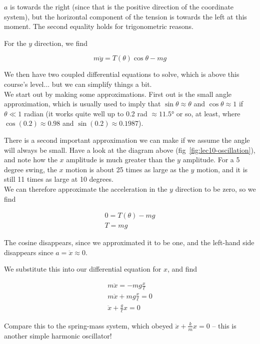 $a$ is towards the right (since that is the positive direction of the coordinate system), but the horizontal component of the tension is towards the left at this moment. The second equality holds for trigonometric reasons.

For the $y$ direction, we find

\begin{equation}
m \ddot{y} = T(\theta) \cos \theta - m g
\end{equation}

We then have two coupled differential equations to solve, which is above this course's level... but we can simplify things a bit.\\
We start out by making some approximations. First out is the small angle approximation, which is usually used to imply that $\sin \theta \approx \theta$ and $\cos \theta \approx 1$ if $\theta \ll 1$ radian (it works quite well up to 0.2 rad $\approx \ang{11.5}$ or so, at least, where $\cos(0.2) \approx 0.98$ and $\sin(0.2) \approx 0.1987$).

There is a second important approximation we can make if we assume the angle will always be small. Have a look at the diagram above (fig~\ref{fig:lec10-oscillation}), and note how the $x$ amplitude is much greater than the $y$ amplitude. For a 5 degree swing, the $x$ motion is about 25 times as large as the $y$ motion, and it is still 11 times as large at 10 degrees.\\
We can therefore approximate the acceleration in the $y$ direction to be zero, so we find

\begin{align}
0 = T(\theta) - m g\\
T = m g
\end{align}

The cosine disappears, since we approximated it to be one, and the left-hand side disappears since $a = \ddot{x} \approx 0$.

We substitute this into our differential equation for $x$, and find

\begin{align}
m\ddot{x} = -m g \frac{x}{\ell}\\
m\ddot{x} + m g \frac{x}{\ell} = 0\\
\ddot{x} + \frac{g}{\ell} x = 0
\end{align}

Compare this to the spring-mass system, which obeyed $\displaystyle \ddot{x} + \frac{k}{m} x = 0$ -- this is another simple harmonic oscillator!

